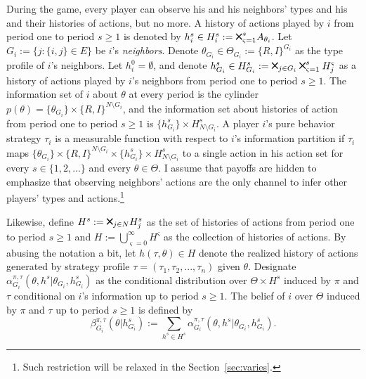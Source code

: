 \documentclass[12pt,letter]{article}
\theoremstyle{definition}
\theoremstyle{remark}
\theoremstyle{claim}
\newcommand{\bigtimes}{\mathbin{\tikz [x=1.4ex,y=1.4ex,line width=.2ex] \draw (0,0) -- (1,1) (0,1) -- (1,0);}}%
\begin{document}
During the game, every player can observe his and his neighbors' types and his and their histories of actions, but no more. A history of actions played by $i$ from period one to period $s\geq 1$ is denoted by $h^s_i\in H^s_{i}:=\bigtimes^s_{\varsigma =1} A_{\theta_i}$. Let $G_i:= \{j:\{i,j\}\in E\}$ be $i$'s \textit{neighbors}. Denote $\theta_{G_i}\in \Theta_{G_i}:= \{R,I\}^{G_i}$ as the type profile of $i$'s neighbors. Let $h^0_i=\emptyset$, and denote $h^s_{G_i}\in H^s_{G_i}:=\bigtimes_{j\in G_i}\bigtimes^s_{\varsigma =1}H^{\varsigma}_j$ as a history of actions played by $i$'s neighbors from period one to period $s\geq 1$. The information set of $i$ about $\theta$ at every period is the cylinder $p(\theta)=\{\theta_{G_i}\}\times \{R,I\}^{N\setminus G_i}$, and the information set about histories of action from period one to period $s\geq 1$ is $\{h^s_{G_i}\}\times H^s_{N\setminus G_i}$. A player $i$'s pure behavior strategy $\tau_{i}$ is a measurable function with respect to $i$'s information partition if $\tau_i$ maps $\{\theta_{G_i}\}\times \{R,I\}^{N\setminus G_i}\times \{h^s_{G_i}\}\times H^s_{N\setminus G_i}$ to a single action in his action set for every $s\in\{1,2,...\}$ and every $\theta\in \Theta$. I assume that payoffs are hidden to emphasize that observing neighbors' actions are the only channel to infer other players' types and actions.\footnote{Such restriction will be relaxed in the Section~\ref{sec:varies}.} 

Likewise, define $H^s:=\bigtimes_{j\in N} H^s_{j}$ as the set of histories of actions from period one to period $s\geq 1$ and $H:= \bigcup^{\infty}_{\varsigma=0} H^{\varsigma}$ as the collection of histories of actions. By abusing the notation a bit, let $h({\tau},\theta)\in H$ denote the realized history of actions generated by strategy profile $\tau=(\tau_1,\tau_2,...,\tau_n)$ given $\theta$. Designate $\alpha^{\pi,\tau}_{G_i}(\theta, h^{s}|\theta_{G_i},h^{s}_{G_i})$ as the conditional distribution over $\Theta\times H^s$ induced by $\pi$ and $\tau$ conditional on $i$'s information up to period $s\geq 1$. The belief of $i$ over $\Theta$ induced by $\pi$ and $\tau$ up to period $s\geq 1$ is defined by 
\[\beta^{\pi,\tau}_{G_i}(\theta|h^{s}_{G_i}):= \sum_{h^{s}\in H^s}\alpha^{\pi,\tau}_{G_i}(\theta, h^{s}|\theta_{G_i},h^{s}_{G_i}).\]
\end{document}
